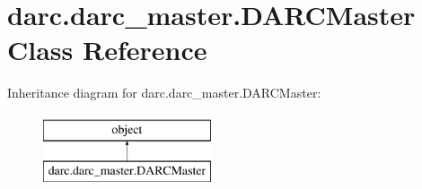 \hypertarget{classdarc_1_1darc__master_1_1_d_a_r_c_master}{}\section{darc.\+darc\+\_\+master.\+D\+A\+R\+C\+Master Class Reference}
\label{classdarc_1_1darc__master_1_1_d_a_r_c_master}
Inheritance diagram for darc.\+darc\+\_\+master.\+D\+A\+R\+C\+Master\+:\begin{figure}[H]
\begin{center}
\leavevmode
\includegraphics[height=2.000000cm]{classdarc_1_1darc__master_1_1_d_a_r_c_master}
\end{center}
\end{figure}
